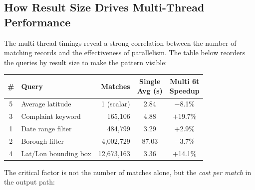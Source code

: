 \documentclass[12pt]{article}
\begin{document}
\subsection{How Result Size Drives Multi-Thread Performance}

The multi-thread timings reveal a strong correlation between the number of
matching records and the effectiveness of parallelism. The table below
reorders the queries by result size to make the pattern visible:

\vspace{0.5em}
\begin{center}
\setlength{\tabcolsep}{5pt}
\renewcommand{\arraystretch}{1.15}
\begin{tabularx}{0.95\textwidth}{c X r c c}
\toprule
\textbf{\#} & \textbf{Query} & \textbf{Matches} &
\makecell{\textbf{Single}\\\textbf{Avg (s)}} &
\makecell{\textbf{Multi 6t}\\\textbf{Speedup}} \\
\midrule
5 & Average latitude        & 1 (scalar)   & 2.84 & $-$8.1\%  \\
3 & Complaint keyword       & 165,106      & 4.88 & $+$19.7\% \\
1 & Date range filter       & 484,799      & 3.29 & $+$2.9\%  \\
2 & Borough filter          & 4,002,729    & 87.03 & $-$3.7\% \\
4 & Lat/Lon bounding box    & 12,673,163   & 3.36 & $+$14.1\% \\
\bottomrule
\end{tabularx}
\end{center}

\vspace{0.5em}
\noindent
The critical factor is not the number of matches alone, but the
\emph{cost per match} in the output path:
\end{document}
